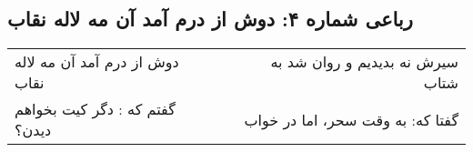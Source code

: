 \begin{center}
\section*{رباعی شماره ۴: دوش از درم آمد آن مه لاله نقاب}
\label{sec:004}
\begin{longtable}{l p{0.5cm} r}
دوش از درم آمد آن مه لاله نقاب
&&
سیرش نه بدیدیم و روان شد به شتاب
\\
گفتم که : دگر کیت بخواهم دیدن؟
&&
گفتا که: به وقت سحر، اما در خواب
\\
\end{longtable}
\end{center}
